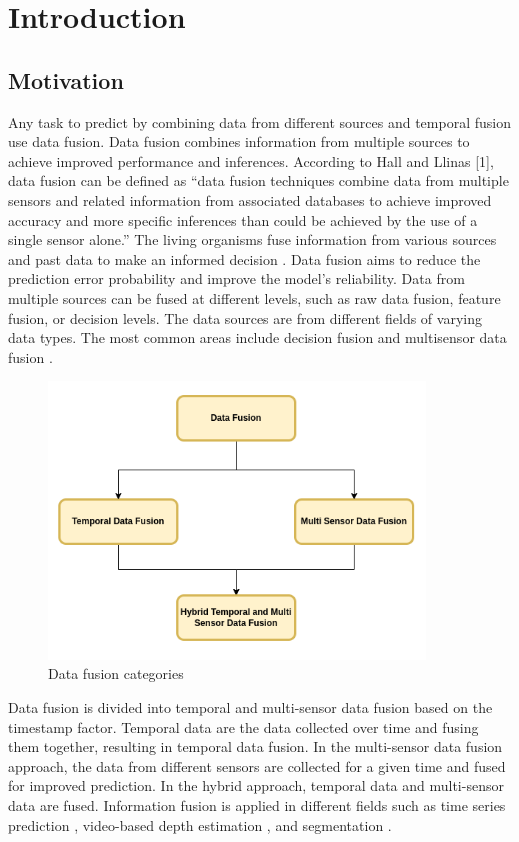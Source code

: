 
    \chapter{Introduction}
	
	\section{Motivation}
		
	Any task to predict by combining data from different sources and temporal fusion use data fusion. Data fusion combines information from multiple sources to achieve improved performance and inferences. According to Hall and Llinas [1], data fusion can be defined as “data fusion techniques combine data from multiple sensors and related information from associated databases to achieve improved accuracy and more specific inferences than could be achieved by the use of a single sensor alone.” The living organisms fuse information from various sources and past data to make an informed decision \cite{01_mandic2005data}.  
	Data fusion aims to reduce the prediction error probability and improve the model's reliability. Data from multiple sources can be fused at different levels, such as raw data fusion, feature fusion, or decision levels. The data sources are from different fields of varying data types. The most common areas include decision fusion and multisensor data fusion \cite{06_castanedo2013review}. 
	
	\begin{figure}[h]
		\centering
		\includegraphics[width=10cm]{images/df.png}
		\caption{Data fusion categories}
		\label{fig:3D_reconstruction}
	\end{figure}

	Data fusion is divided into temporal and multi-sensor data fusion based on the timestamp factor. Temporal data are the data collected over time and fusing them together, resulting in temporal data fusion. In the multi-sensor data fusion approach, the data from different sensors are collected for a given time and fused for improved prediction. In the hybrid approach, temporal data and multi-sensor data are fused. Information fusion is applied in different fields such as time series prediction \cite{02_lim2021temporal}, video-based depth estimation \cite{03_duzceker2021deepvideomvs}, and segmentation \cite{04_li2021spatial}.
	

